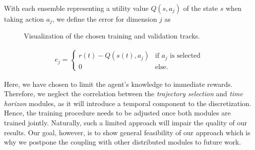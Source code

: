 With each ensemble representing a utility value $Q(s,a_j)$ of the state $s$  when taking action $a_j$, we define the error for dimension $j$ as

\begin{figure}[t!]
\centering
{}
\hspace{1cm}
\caption{Visualization of the chosen training and validation tracks.}
\label{fig:tracks}
\end{figure}

\begin{align}
e_j = \begin{cases}
r(t) - Q(s(t),a_j) & \text{if } a_j \text{ is selected}\\
0 & \text{else}.
\end{cases}
\end{align}

Here, we have chosen to limit the agent's knowledge to immediate rewards.
Therefore, we neglect the correlation between the \emph{trajectory selection} and \emph{time horizon} modules, as it will introduce a temporal component to the discretization.
Hence, the training procedure needs to be adjusted once both modules are trained jointly.
Naturally, such a limited approach will impair the quality of our results.
Our goal, however, is to show general feasibility of our approach which is why we postpone the coupling with other distributed modules to future work.

